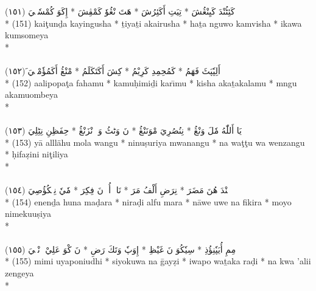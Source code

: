 \documentclass[a4paper, 12pt]{report}
\begin{document}
\begin{center}
\textarabic{(١٥١) \textcolor{mygreen}{كَئِٹُنْدَ كَيِنْڠُشَ  * تِيَتِ أَكَئِرُشَ  * هَتَ نْڠُوٗ كَمْڤِشَ  * إِكَوَ كُمْسٗمٖيَ }} \\* 
(151) kaiţunḏa kayingusha  * ṯiyaṯi akairusha  * haṯa nguwo kamvisha  * ikawa kumsomeya  \\* 
 \\ 
\\[8mm] 

\textarabic{(١٥٢) \textcolor{mygreen}{َأَلِپٗپَٹَ فَهَمُ  * كَمُحِمِدِ كَرِيْمُ  * كِشَ أَكَتَكَلَمُ  * مْنْڠُ أَكَمُؤٗمْبٖيَ }} \\* 
(152) aalipopaţa fahamu  * kamuḥimiḏi karı̄mu  * kisha akaṯakalamu  * mngu akamuombeya  \\* 
 \\ 
\\[8mm] 

\textarabic{(١٥٣) \textcolor{mygreen}{يَا أَللّٰهُ مٗلَ وَنْڠُ  * نِنُصُرِيَ مْوَنَنْڠُ  * نَ وَٹٹُ وَ وٖنْزَنْڠُ  * حِفَظِنِ نِٹِلِيَ }} \\* 
(153) yā alllähu mola wangu  * ninuṣuriya mwanangu  * na waţţu wa wenzangu  * ḥifaẓini niţiliya  \\* 
 \\ 
\\[8mm] 

\textarabic{(١٥٤) \textcolor{mygreen}{إٖنٖنْدَ هُنَ مَضَرَ  * نِرَضِ أَلْفُ مَرَ  * نَاوٖ أُوٖ نَ فِكِرَ  * مٗيٗ نِمٖكُؤُصِيَ }} \\* 
(154) enenḏa huna maḍara  * niraḍi alfu mara  * nāwe uwe na fikira  * moyo nimekuuṣiya  \\* 
 \\ 
\\[8mm] 

\textarabic{(١٥٥) \textcolor{mygreen}{مِمِ أُيَپٗنِؤُذِ  * سِيٗكُوَ نَ غَيْظِ  * إِوَپٗ وَتَكَ رَضِ  * نَ كْوَ عَلِيْ زٖنْڠٖيَ }} \\* 
(155) mimi uyaponiudhi  * siyokuwa na ḡayẓi  * iwapo waṯaka raḍi  * na kwa 'alii zengeya  \\* 
 \\ 
\\[8mm] 


\end{center}
\end{document}
